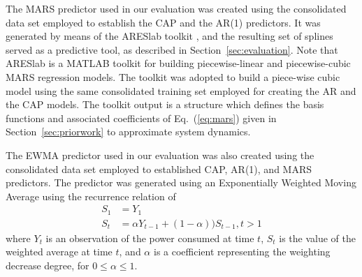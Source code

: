 \documentclass[prodmode,acmtaco,pdftex]{acmsmall}
\newcommand{\equationname}{Eq.}
\begin{document}
The MARS predictor used in our evaluation was created using the
consolidated data set employed to establish the CAP and the AR(1)
predictors.  It was generated by means of the ARESlab toolkit
\cite{Jekabsons2010}, and the resulting set of splines served as a
predictive tool, as described in Section~\ref{sec:evaluation}.  Note
that ARESlab is a MATLAB toolkit for building piecewise-linear and
piecewise-cubic MARS regression models.  The toolkit was adopted to
build a piece-wise cubic model using the same consolidated training set
employed for creating the AR and the CAP models.  The toolkit output is
a structure which defines the basis functions and associated
coefficients of \equationname~(\ref{eq:mars}) given in
Section~\ref{sec:priorwork} to approximate system dynamics.

The EWMA predictor used in our evaluation was also created using the
consolidated data set employed to established CAP, AR(1), and MARS
predictors.  The predictor was generated using an Exponentially Weighted
Moving Average using the recurrence relation of
\begin{align}
  \label{eq:1}
  S_{1}&=Y_{1}\nonumber\\
  S_{t}&=\alpha Y_{t-1}+(1-\alpha))S_{t-1}, t>1\nonumber
\end{align}
where $Y_{t}$ is an observation of the power consumed at time $t$,
$S_{t}$ is the value of the weighted average at time $t$, and $\alpha$
is a coefficient representing the weighting decrease degree, for
$0\leq \alpha \leq1$.

\label{sec:references}



\end{document}
